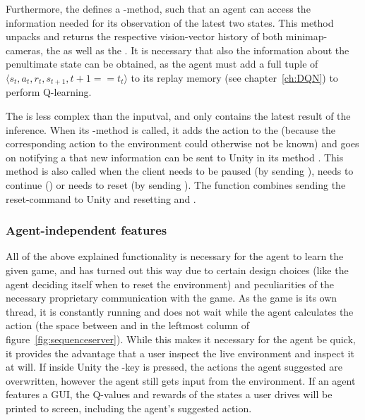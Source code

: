 Furthermore, the  defines a -method, such that an agent can access the information needed for its observation of the latest two states. This method unpacks and returns the respective vision-vector history of both minimap-cameras, the  as well as the . It is necessary that also the information about the penultimate state can be obtained, as the agent must add a full tuple of $\langle s_t, a_t, r_t, s_{t+1}, t+1==t_t \rangle$ to its replay memory (see chapter~\ref{ch:DQN}) to perform Q-learning. 

The  is less complex than the inputval, and only contains the latest result of the inference. When its -method is called, it adds the action to the  (because the corresponding action to the environment could otherwise not be known) and goes on notifying a  that new information can be sent to Unity in its method . This method is also called when the client needs to be paused (by sending ), needs to continue () or needs to reset (by sending ). The function  combines sending the reset-command to Unity and resetting  and .

\subsubsection{Agent-independent features}

All of the above explained functionality is necessary for the agent to learn the given game, and has turned out this way due to certain design choices (like the agent deciding itself when to reset the environment) and peculiarities of the necessary proprietary communication with the game. As the game is its own thread, it is constantly running and does not wait while the agent calculates the action (the space between  and  in the leftmost column of figure~\ref{fig:sequenceserver}). While this makes it necessary for the agent be quick, it provides the advantage that a user inspect the live environment and inspect it at will. If inside Unity the -key is pressed, the actions the agent suggested are overwritten, however the agent still gets input from the environment. If an agent features a GUI, the Q-values and rewards of the states a user drives will be printed to screen, including the agent's suggested action.

